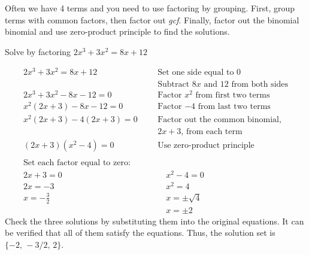 \begin{nt}
    Often we have 4 terms and you need to use factoring by grouping. First, group terms with common factors, then factor out \textit{gcf}. Finally, factor out the binomial binomial and use zero-product principle to find the solutions. 
\end{nt}
\begin{exa}
  Solve by factoring $2x^3+3x^2=8x+12$
\end{exa}
\begin{align*}
    2x^3+3x^2=8x+12&    &   &\text{Set one side equal to 0}\\
    &&&\text{Subtract $8x$ and $12$ from both sides}\\
    2x^3+3x^2-8x-12=0&  &   &\text{Factor $x^2$ from first two terms}\\
    x^2(2x+3)-8x-12=0&  &   &\text{Factor $-4$ from last two terms}\\
    x^2(2x+3)-4(2x+3)=0&    &   &\text{Factor out the common binomial,}\\
    &&&\text{$2x+3$, from each term}\\
    (2x+3)(x^2-4)=0&    &&\text{Use zero-product principle}\\
     &&&\\
    \text{Set each factor equal to zero:}&&&\\
            2x+3=0&   &   &\quad x^2-4=0\\
            2x=-3&    &   &\quad x^2=4\\
            x=-\frac{3}{2}& &  &\quad x=\pm \sqrt{4}\\
            &   &              &\quad x=\pm 2
\end{align*}
Check the three solutions by substituting them into the original equations. It can be verified that all of them satisfy the equations. Thus, the solution set is $\{-2,\,-3/2,\, 2\}$.
